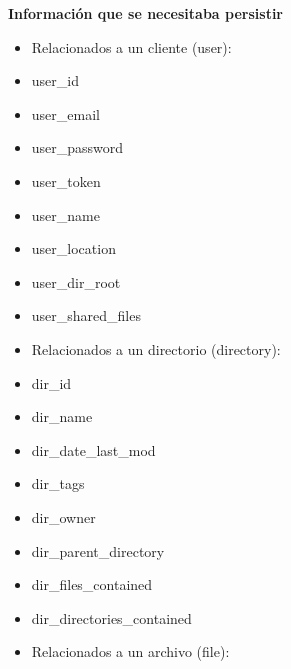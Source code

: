 \documentclass[letterpaper,10pt,english]{sphinxmanual}
\begin{document}
\textbf{Información que se necesitaba persistir}
\begin{itemize}
\item {} 
Relacionados a un cliente (user):

\end{itemize}
\begin{itemize}
\item {} 
user\_id

\item {} 
user\_email

\item {} 
user\_password

\item {} 
user\_token

\item {} 
user\_name

\item {} 
user\_location

\item {} 
user\_dir\_root

\item {} 
user\_shared\_files

\end{itemize}
\begin{itemize}
\item {} 
Relacionados a un directorio (directory):

\end{itemize}
\begin{itemize}
\item {} 
dir\_id

\item {} 
dir\_name

\item {} 
dir\_date\_last\_mod

\item {} 
dir\_tags

\item {} 
dir\_owner

\item {} 
dir\_parent\_directory

\item {} 
dir\_files\_contained

\item {} 
dir\_directories\_contained

\end{itemize}
\begin{itemize}
\item {} 
Relacionados a un archivo (file):

\end{itemize}
\end{document}

